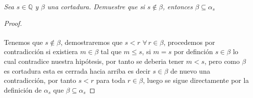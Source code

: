\documentclass[11pt,letterpaper]{article}
\newcommand{\Q}{\mathbb{Q}}
\begin{document}
\begin{tcolorbox}[
	title = \textcolor{black}{\textcolor{white}{Problema 4}},]
\textit{Sea $s\in \Q$ y $\beta$ una cortadura. Demuestre que si $s\notin \beta$, entonces $\beta\subseteq \alpha_s$
}
\end{tcolorbox}
\begin{proof}\,\\
    \,\\
    Tenemos que $s\notin \beta$, demostraremos que $s<r$ $\forall\,r\in \beta$, procedemos por contradicci\'on
        si existiera $m\in\beta $ tal que $m\leq s$, si $m=s$ por definci\'on $s\in \beta$ lo cual contradice nuestra hip\'otesis, por tanto
        se deberia tener $m<s$, pero como $\beta$ es cortadura esta es cerrada hacia arriba es decir $s\in \beta$ de nuevo una contradicci\'on, por tanto
        $s<r$ para toda $r\in \beta$, luego se sigue directamente por la definici\'on de $\alpha_s$ que $\beta\subseteq\alpha_s$
\end{proof}
\newpage
\end{document}
